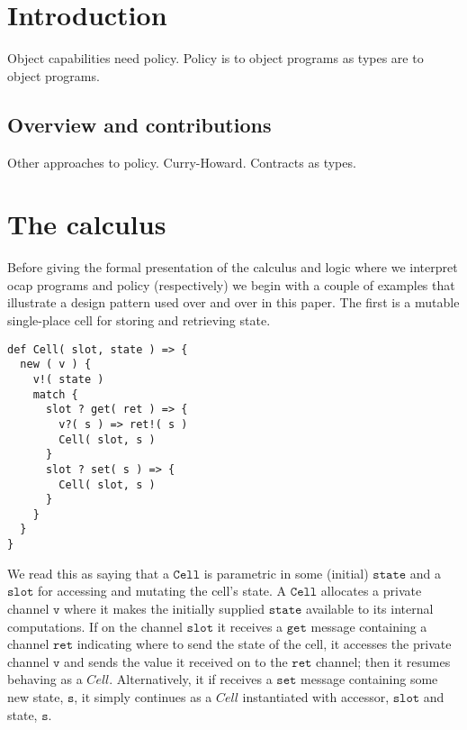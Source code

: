\documentclass[]{amsart}
\theoremstyle{definition}
\theoremstyle{remark}
\numberwithin{equation}{subsection}
\newcommand{\paperversion}{Draft Version 0.1 - July 19, 2013}
\newenvironment{toc}
{
\begin{list}{}{
   \setlength{\leftmargin}{0.4in}
   \setlength{\rightmargin}{0.6in}
   \setlength{\parskip}{0pt}
 } \item }
{\end{list}}
\begin{document}



\section{Introduction}

Object capabilities need policy. Policy is to object programs as types
are to object programs.

\subsection{Overview and contributions} 

Other approaches to policy. Curry-Howard. Contracts as types.


\section{The calculus}

Before giving the formal presentation of the calculus and logic where
we interpret ocap programs and policy (respectively) we begin with a
couple of examples that illustrate a design pattern used over and over
in this paper. The first is a mutable single-place cell for storing
and retrieving state.

\begin{lstlisting}
def Cell( slot, state ) => {
  new ( v ) {
    v!( state )
    match {
      slot ? get( ret ) => { 
        v?( s ) => ret!( s )
        Cell( slot, s )
      }
      slot ? set( s ) => {
        Cell( slot, s )
      }
    }
  }
}
\end{lstlisting}

We read this as saying that a $\texttt{Cell}$ is parametric in some (initial)
$\texttt{state}$ and a $\texttt{slot}$ for accessing and mutating the
cell's state. A $\texttt{Cell}$ allocates a private channel
$\texttt{v}$ where it makes the initially supplied $\texttt{state}$
available to its internal computations. If on the channel
$\texttt{slot}$ it receives a $\texttt{get}$ message containing a
channel $\texttt{ret}$ indicating where to send the state of the cell,
it accesses the private channel $\texttt{v}$ and sends the value it
received on to the $\texttt{ret}$ channel; then it resumes behaving as
a $Cell$. Alternatively, it if receives a $\texttt{set}$ message
containing some new state, $\texttt{s}$, it simply continues as a
$Cell$ instantiated with accessor, $\texttt{slot}$ and state,
$\texttt{s}$.
\end{document}
